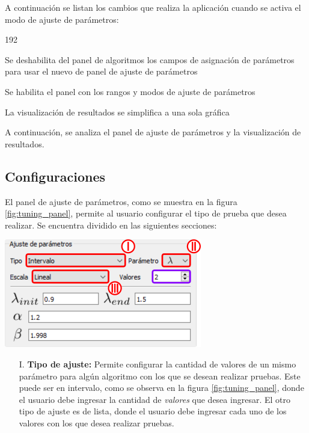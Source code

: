 \documentclass[12pt,twoside,letter]{ol-softwaremanual}
\newenvironment{Figure}
  {\par\medskip\noindent\minipage{\linewidth}}
  {\endminipage\par\medskip}
\begin{document}
A continuación se listan los cambios que realiza la aplicación cuando se activa el modo de ajuste de parámetros:

\begin{dingautolist}{192}
	\setlength\itemsep{0em}
	\item Se deshabilita del panel de algoritmos los campos de asignación de parámetros para usar el nuevo de panel de ajuste de parámetros
	\item Se habilita el panel con los rangos y modos de ajuste de parámetros
	\item La visualización de resultados se simplifica a una sola gráfica
\end{dingautolist}

A continuación, se analiza el panel de ajuste de parámetros y la visualización de resultados.

\subsection{Configuraciones}

El panel de ajuste de parámetros, como se muestra en la figura \ref{fig:tuning_panel}, permite al usuario configurar el tipo de prueba que desea realizar. Se encuentra dividido en las siguientes secciones:

\begin{multicols}{2}
	
\begin{Figure}
	\centering
	\includegraphics[width=0.9\linewidth]{tuning-panel.png}
	\label{fig:tuning_panel}
\end{Figure}	

\begin{itemize}
	
    \item[I.] \textbf{Tipo de ajuste:} Permite configurar la cantidad de valores de un mismo parámetro para algún algoritmo con los que se desean realizar pruebas. Este puede ser en intervalo, como se observa en la figura \ref{fig:tuning_panel}, donde el usuario debe ingresar la cantidad de \textcolor{ClearPurple}{\emph{valores}} que desea ingresar. El otro tipo de ajuste es de lista, donde el usuario debe ingresar cada uno de los valores con los que desea realizar pruebas.    
    
\end{itemize}

\end{multicols}
\end{document}
